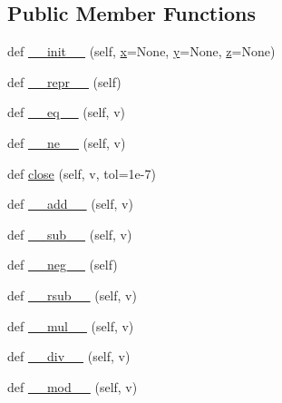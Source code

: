 \subsection*{Public Member Functions}
\begin{DoxyCompactItemize}
\item 
def \mbox{\hyperlink{classpymavlink_1_1rotmat_1_1Vector3_a74d5a2458dd0c03f178781860aeefe3d}{\+\_\+\+\_\+init\+\_\+\+\_\+}} (self, \mbox{\hyperlink{classpymavlink_1_1rotmat_1_1Vector3_abf902e4255e330c7e89fee6dd9ba9e25}{x}}=None, \mbox{\hyperlink{classpymavlink_1_1rotmat_1_1Vector3_a60045ae80acd7753b9fb083e5bd200c5}{y}}=None, \mbox{\hyperlink{classpymavlink_1_1rotmat_1_1Vector3_a5552bcce4c8e91996e2b161166b3e30e}{z}}=None)
\item 
def \mbox{\hyperlink{classpymavlink_1_1rotmat_1_1Vector3_a6f512d3cc5cd1386aea176e7f6ee6bc0}{\+\_\+\+\_\+repr\+\_\+\+\_\+}} (self)
\item 
def \mbox{\hyperlink{classpymavlink_1_1rotmat_1_1Vector3_a5bf4f176c370a8bb706c5a9c401eec84}{\+\_\+\+\_\+eq\+\_\+\+\_\+}} (self, v)
\item 
def \mbox{\hyperlink{classpymavlink_1_1rotmat_1_1Vector3_ae2e17aa02638a4ecf763aaac658be74f}{\+\_\+\+\_\+ne\+\_\+\+\_\+}} (self, v)
\item 
def \mbox{\hyperlink{classpymavlink_1_1rotmat_1_1Vector3_a53281a75b654ebb6934af427409f4643}{close}} (self, v, tol=1e-\/7)
\item 
def \mbox{\hyperlink{classpymavlink_1_1rotmat_1_1Vector3_a4e8e0ec45084ca78184bf01a5921d8d5}{\+\_\+\+\_\+add\+\_\+\+\_\+}} (self, v)
\item 
def \mbox{\hyperlink{classpymavlink_1_1rotmat_1_1Vector3_ae99e68a5082cc1251ee12bcc198e331b}{\+\_\+\+\_\+sub\+\_\+\+\_\+}} (self, v)
\item 
def \mbox{\hyperlink{classpymavlink_1_1rotmat_1_1Vector3_a60f4bb01932c3042a90c4e5b6989d743}{\+\_\+\+\_\+neg\+\_\+\+\_\+}} (self)
\item 
def \mbox{\hyperlink{classpymavlink_1_1rotmat_1_1Vector3_afee5ea0e352d8883870289c7a3ff4c00}{\+\_\+\+\_\+rsub\+\_\+\+\_\+}} (self, v)
\item 
def \mbox{\hyperlink{classpymavlink_1_1rotmat_1_1Vector3_a72830f54f802d3036095d57e38d34055}{\+\_\+\+\_\+mul\+\_\+\+\_\+}} (self, v)
\item 
def \mbox{\hyperlink{classpymavlink_1_1rotmat_1_1Vector3_aa2b5ddcbf7fea7dd749f2b8d38df9e25}{\+\_\+\+\_\+div\+\_\+\+\_\+}} (self, v)
\item 
def \mbox{\hyperlink{classpymavlink_1_1rotmat_1_1Vector3_a757f1c9fe6ced2d39b5c166f9cb40399}{\+\_\+\+\_\+mod\+\_\+\+\_\+}} (self, v)

\end{DoxyCompactItemize}
